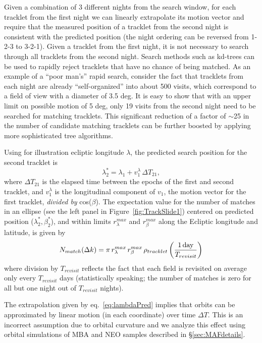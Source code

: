 Given a combination of 3 different nights from the search window, for each tracklet 
from the first night we can linearly extrapolate its motion vector and require that the
measured  position of a tracklet from the second night is consistent with the predicted 
position (the night ordering can be reversed from 1-2-3 to 3-2-1). Given a tracklet from
the first night, it is not necessary to search through all tracklets from the second night. 
Search methods such as kd-trees can be used to rapidly reject tracklets that have no 
chance of being matched. As an example of a ``poor man's'' rapid search, consider the 
fact that tracklets from each night are already ``self-organized'' into about 500 visits, 
which correspond to a field of view with a diameter of 3.5 deg. It is easy to show that with
an upper limit on possible motion of 5 deg, only 19 visits from the second night need to be 
searched for matching  tracklets. This significant reduction of a factor of $\sim$25 in
the number of candidate matching tracklets can be further boosted by applying more 
sophisticated tree algorithms. 

Using for illustration ecliptic longitude $\lambda$, the predicted search position for the
second tracklet is 
\begin{equation}
\label{eq:lambdaPred}
               \lambda_2^\ast = \lambda_1 + v_1^\lambda \, \Delta T_{21},
\end{equation}
where $\Delta T_{21}$ is the elapsed time between the epochs of the first and second tracklet,
and $v_1^\lambda$ is the longitudinal component of $v_1$, the motion vector for the first 
tracklet, {\it divided by} cos($\beta$). The expectation value for the number of matches in 
an ellipse (see the left panel in Figure~\ref{fig:TrackSlide1}) 
centered on predicted position ($\lambda_2^\ast, \beta_2^\ast$), and within limits $r_\lambda^{max}$ 
and  $r_\beta^{max}$ along the Ecliptic longitude and latitude, is given by 
\begin{equation}
\label{eq:Nmdk}
     N_{match}(\Delta k) = \pi \, r_\lambda^{max} \, r_\beta^{max}  \, \rho_{tracklet} \left({1 \, {\rm day} \over T_{revisit}}\right) 
\end{equation}
where division by $T_{revisit}$ reflects the fact that each field is revisited on average only 
every $T_{revisit}$ days (statistically speaking; the number of matches is zero for all but one 
night out of $T_{revisit}$ nights). 

The extrapolation given by eq.~\ref{eq:lambdaPred} implies that orbits can be approximated by 
linear motion (in each coordinate) over time $\Delta T$. This is an incorrect assumption 
due to orbital curvature and we analyze this effect using orbital simulations of MBA and NEO
samples described in \S\ref{sec:MAFdetails}. 

